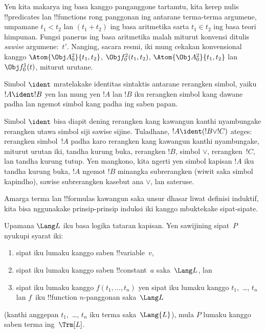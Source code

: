 \documentclass[../../../include/open-logic-section]{subfiles}
\begin{document}
Yen kita makarya ing basa kanggo panganggone tartamtu, kita kerep
nulis !!{predicate}s lan !!{function}s rong panggonan ing antarane
terma-terma argumene, umpamane $t_1 < t_2$ lan $(t_1 + t_2)$ ing basa
aritmetika sarta $t_1 \in t_2$ ing basa teori himpunan. Fungsi
panerus ing basa aritmetika malah miturut konvensi ditulis \emph{sawise}
argumene:~$t'$. Nanging, sacara resmi, iki mung cekakan konvensional
kanggo $\Atom{\Obj A^2_0}{t_1, t_2}$,
$\Obj f^2_0(t_1, t_2)$, $\Atom{\Obj A^2_0}{t_1, t_2}$ lan $\Obj f^1_0(t)$,
miturut urutane.

\begin{defn}
Simbol $\ident$ mratelakake identitas sintaktis antarane rerangken
simbol, yaiku $!A \ident !B$ yen lan mung yen $!A$ lan $!B$ iku
rerangken simbol kang dawane padha lan ngemot simbol kang padha ing
saben papan.
\end{defn}

Simbol $\ident$ bisa diapit dening rerangken kang kawangun kanthi
nyambungake rerangken utawa simbol siji sawise sijine. Tuladhane,
$!A \ident (!B \lor !C)$ ateges: rerangken simbol~$!A$ padha karo
rerangken kang kawangun kanthi nyambungake, miturut urutan iki,
tandha kurung buka, rerangken $!B$, simbol $\lor$, rerangken~$!C$,
lan tandha kurung tutup. Yen mangkono, kita ngerti yen simbol kapisan
$!A$ iku tandha kurung buka, $!A$ ngemot $!B$ minangka subrerangken
(wiwit saka simbol kapindho), sawise subrerangken kasebut ana $\lor$,
lan sateruse.

Amarga terma lan !!{formula}s kawangun saka unsur dhasar liwat definisi
induktif, kita bisa nggunakake prinsip-prinsip induksi iki kanggo
mbuktekake sipat-sipate.

\begin{lem}
    Upamana $\Lang L$ iku basa logika tataran kapisan.
    Yen sawijining sipat~$P$ nyukupi syarat iki:
    \begin{enumerate}
        \item sipat iku lumaku kanggo saben !!{variable}~$v$,
        \item sipat iku lumaku kanggo saben !!{constant}~$a$ saka~$\Lang L$, lan
        \item sipat iku lumaku kanggo $f(t_1,\dotsc,t_n)$ yen sipat iku
        lumaku kanggo $t_1$,~\dots, $t_n$ lan $f$~iku !!{function}
            $n$-panggonan saka~$\Lang L$
    \end{enumerate}
    (kanthi anggepan $t_1$,~\dots, $t_n$ iku terma saka~$\Lang{L}$),
    mula $P$ lumaku kanggo saben terma ing~$\Trm[L]$.
\end{lem}
\end{document}
